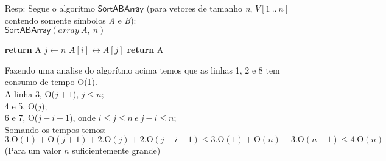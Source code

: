 \documentclass{homework}
\begin{document}
\pagestyle{fancy}

	\begin{enumerate}
		\item[Resp:] Segue o algoritmo $\mathsf{SortABArray}$ (para vetores de tamanho \textit{n}, $V[1\ ..\ n]$ contendo somente símbolos \textit{A} e \textit{B}):\\
			$\mathsf{SortABArray}(array\ A,\ n)$
			\begin{algorithmic}[1]
					\textbf{return} A
				\EndIf
				\State $j \gets n$
				                \State $A[i] \longleftrightarrow A[j]$
				            \EndIf
				        \EndFor
				    \EndIf
				\EndFor
				\State \textbf{return} A
			\end{algorithmic}
			Fazendo uma analise do algorítmo acima temos que as linhas 1, 2 e 8 tem consumo de tempo O(1).\\
			A linha 3, O($j+1$), $j \leq n$; \\
			4 e 5, O($j$); \\
			6 e 7, O($j-i-1$), onde $i \leq j \leq n\ e\ j - i \leq n$; \\
			Somando os tempos temos: \[
                3.\mathrm{O}(1) + \mathrm{O}(j+1) + 2.\mathrm{O}(j) + 2.\mathrm{O}(j-i-1) \leq 3.\mathrm{O}(1) + \mathrm{O}(n) + 3.\mathrm{O}(n-1) \leq 4.\mathrm{O}(n)
			\] (Para um valor $n$ suficientemente grande)
	\end{enumerate}
\end{document}
